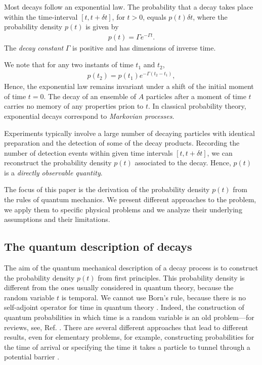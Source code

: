 \documentclass[12pt]{article}
\numberwithin{equation}{section}
\begin{document}
Most decays follow an exponential law.  The probability that a decay takes place within the time-interval
  $[t, t+ \delta t]$, for $t > 0 $,  equals  $p(t) \delta t$, where the probability density $p(t)$ is given by
\begin{eqnarray}
p(t) = \Gamma e^{- \Gamma t}. \label{probdec}
\end{eqnarray}
The {\em decay constant} $\Gamma$ is positive and has dimensions of inverse time.

We note that for any two instants of time $t_1$ and $t_2$,
\begin{eqnarray}
p(t_2) = p(t_1) e^{-\Gamma(t_2-t_1)},
\end{eqnarray}
Hence, the exponential law remains invariant under a shift of the     initial moment of time $t = 0$. The decay of an ensemble of $A$ particles after a moment of time $t$ carries no memory of any properties prion to $t$. In classical  probability theory, exponential decays correspond to {\em Markovian processes}.

Experiments typically involve a large number of decaying particles with identical preparation and the detection of  some of  the decay products. Recording the number of detection events within given time intervals $[t, t+\delta t]$, we can reconstruct the probability density $p(t)$ associated to the decay. Hence,  $p(t)$ is a {\em directly observable quantity}.

The focus of this paper is the derivation of the probability density $p(t)$ from the rules of quantum mechanics. We present different approaches to the problem, we apply them to specific physical problems and we analyze their underlying assumptions and their limitations.









\subsection{The quantum description of decays}

The aim of the quantum mechanical description of a decay process is to construct the probability density $p(t)$ from first principles. This probability density is different from the ones usually considered in quantum theory, because  the random variable $t$ is   temporal.  We cannot use Born's rule, because there is no self-adjoint operator for time in quantum theory \cite{Pauli}. Indeed, the construction of quantum probabilities in which time is a random variable is an old problem---for reviews, see,  Ref.   \cite{ToAbooks}. There are several different approaches that lead to different results, even for elementary problems, for example, constructing probabilities for the time of arrival \cite{ML} or   specifying the time it takes a particle to tunnel through a potential barrier \cite{tunt}.
\end{document}
